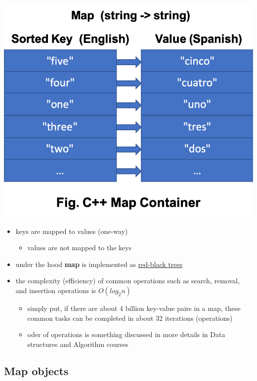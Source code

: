\documentclass[11pt]{article}
\providecommand{\tightlist}{%
      \setlength{\itemsep}{0pt}\setlength{\parskip}{0pt}}
\begin{document}
\includegraphics{resources/Map.png}

\begin{itemize}
\tightlist
\item
  keys are mapped to values (one-way)

  \begin{itemize}
  \tightlist
  \item
    values are not mapped to the keys
  \end{itemize}
\item
  under the hood \textbf{map} is implemented as
  \href{https://en.wikipedia.org/wiki/Red\%E2\%80\%93black_tree}{red-black
  trees}
\item
  the complexity (efficiency) of common operations such as search,
  removal, and insertion operations is \(O(log_2 n)\)

  \begin{itemize}
  \tightlist
  \item
    simply put, if there are about 4 billion key-value pairs in a map,
    these common tasks can be completed in about 32 iterations
    (operations)
  \item
    oder of operations is something discussed in more details in Data
    structures and Algorithm courses
  \end{itemize}
\end{itemize}

    \hypertarget{map-objects}{%
\subsection{Map objects}\label{map-objects}}
\end{document}
